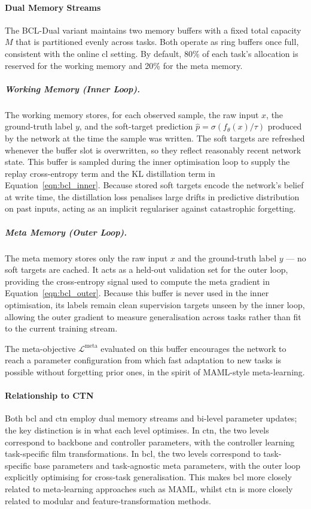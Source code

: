 \paragraph{Dual Memory Streams}

The BCL-Dual variant maintains two memory buffers with a fixed total capacity
$M$ that is partitioned evenly across tasks. Both operate as ring buffers once
full, consistent with the online \gls{cl} setting. By default, 80\% of each
task's allocation is reserved for the working memory and 20\% for the meta
memory.

\subparagraph{Working Memory (Inner Loop).} The working memory stores, for each
observed sample, the raw input $x$, the ground-truth label $y$, and the
soft-target prediction $\hat{p} = \sigma(f_\theta(x)/\tau)$ produced by the
network at the time the sample was written. The soft targets are refreshed
whenever the buffer slot is overwritten, so they reflect reasonably recent
network state. This buffer is sampled during the inner optimisation loop to
supply the replay cross-entropy term and the KL distillation term in
Equation~\ref{eqn:bcl_inner}. Because stored soft targets encode the
network's belief at write time, the distillation loss penalises large drifts in
predictive distribution on past inputs, acting as an implicit regulariser
against catastrophic forgetting.

\subparagraph{Meta Memory (Outer Loop).} The meta memory stores only the raw
input $x$ and the ground-truth label $y$ — no soft targets are cached. It acts
as a held-out validation set for the outer loop, providing the cross-entropy
signal used to compute the meta gradient in
Equation~\ref{eqn:bcl_outer}. Because this buffer is never used in the inner
optimisation, its labels remain clean supervision targets unseen by the inner
loop, allowing the outer gradient to measure generalisation across tasks rather
than fit to the current training stream.

The meta-objective $\mathcal{L}^{\text{meta}}$ evaluated on this buffer
encourages the network to reach a parameter configuration from which fast
adaptation to new tasks is possible without forgetting prior ones, in the
spirit of MAML-style meta-learning.

\paragraph{Relationship to CTN}

Both \gls{bcl} and \gls{ctn} employ dual memory streams and bi-level parameter
updates; the key distinction is in what each level optimises. In \gls{ctn}, the
two levels correspond to backbone and controller parameters, with the controller
learning task-specific \gls{film} transformations. In \gls{bcl}, the two levels
correspond to task-specific base parameters and task-agnostic meta parameters,
with the outer loop explicitly optimising for cross-task generalisation. This
makes \gls{bcl} more closely related to meta-learning approaches such as MAML,
whilst \gls{ctn} is more closely related to modular and feature-transformation
methods.